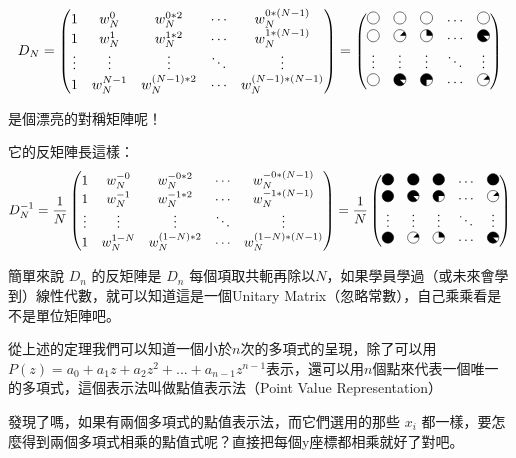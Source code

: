 \[
D_N
=
\begin{pmatrix}    
1 & w_N^0 & w_N^{0*2} & \cdots  & w_N^{0*(N-1)} \\     
1 & w_N^1 & w_N^{1*2} & \cdots  & w_N^{1*(N-1)} \\     
\vdots & \vdots & \vdots & \ddots & \vdots \\     
1 & w^{N-1}_{N} & w^{(N-1)*2}_{N} & \cdots  & w^{(N-1)*(N-1)}_{N} \end{pmatrix}
=
\begin{pmatrix}    
\pie{0} & \pie{0} & \pie{0} & \cdots  & \pie{0} \\     
\pie{0} & \pie{45} & \pie{90} & \cdots  & \pie{315)} \\     
\vdots & \vdots & \vdots & \ddots & \vdots \\     
\pie{0} & \pie{315} & \pie{270} & \cdots  & \pie{45} 
\end{pmatrix}
 \]

是個漂亮的對稱矩陣呢！

它的反矩陣長這樣：
\[
D_N^{-1}
=
\frac 1 N
\begin{pmatrix}     
1 & w_N^{-0} & w_N^{-0*2} & \cdots  & w_N^{-0*(N-1)} \\     
1 & w_N^{-1} & w_N^{-1*2} & \cdots  & w_N^{-1*(N-1)} \\     
\vdots & \vdots & \vdots & \ddots & \vdots \\     
1 & w^{1-N}_{N} & w^{(1-N)*2}_{N} & \cdots  & w^{(1-N)*(N-1)}_{N} \end{pmatrix}
=
\frac 1 N
\begin{pmatrix}     
\pie{360} & \pie{360} & \pie{360} & \cdots  & \pie{360)} \\     
\pie{360} & \pie{315} & \pie{270} & \cdots  & \pie{45} \\     
\vdots & \vdots & \vdots & \ddots & \vdots \\     
\pie{360}& \pie{45} & \pie{90} & \cdots  & \pie{315} 
\end{pmatrix}
\]

簡單來說 $D_n$ 的反矩陣是 $D_n$ 每個項取共軛再除以$N$，如果學員學過（或未來會學到）線性代數，就可以知道這是一個Unitary Matrix（忽略常數），自己乘乘看是不是單位矩陣吧。


從上述的定理我們可以知道一個小於$n$次的多項式的呈現，除了可以用$P(z)=a_0+a_1z+a_2z^2+...+a_{n-1}z^{n-1}$表示，還可以用$n$個點來代表一個唯一的多項式，這個表示法叫做點值表示法（Point Value Representation）

發現了嗎，如果有兩個多項式的點值表示法，而它們選用的那些 $x_i$ 都一樣，要怎麼得到兩個多項式相乘的點值式呢？直接把每個y座標都相乘就好了對吧。

